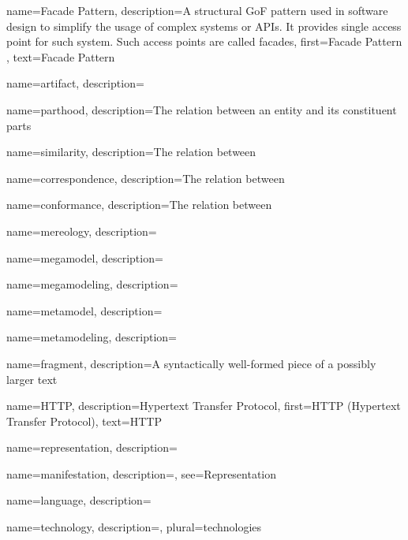{
    name={Facade Pattern},
    description={A structural \gls{GoF} pattern used in software design to simplify the usage of complex systems or \glspl{API}. It provides single access point for such system. Such access points are called facades},
    first={Facade Pattern \cite{Gamma:1995:DPE:186897}},
    text={Facade Pattern}
}

{
    name={artifact},
    description={}
}

{
    name={parthood},
    description={The relation between an entity and its constituent parts}
}

{
    name={similarity},
    description={The relation between }
}

{
    name={correspondence},
    description={The relation between }
}

{
    name={conformance},
    description={The relation between }
}

{
    name={mereology},
    description={}
}

{
    name={megamodel},
    description={}
}

{
    name={megamodeling},
    description={}
}

{
    name={metamodel},
    description={}
}

{
    name={metamodeling},
    description={}
}

{
    name={fragment},
    description={A syntactically well-formed piece of a possibly larger text}
}

{
    name=HTTP,
    description={Hypertext Transfer Protocol},
    first={HTTP (Hypertext Transfer Protocol)},
    text={HTTP}
}

{
    name={representation},
    description={}
}

{
    name={manifestation},
    description={},
    see={Representation}   
}

{
    name={language},
    description={}
}

{
    name={technology},
    description={},
    plural={technologies}
}

